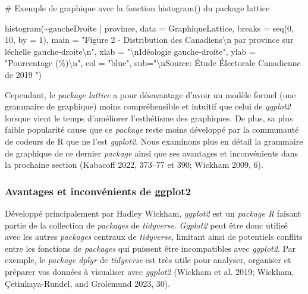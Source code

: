 \documentclass[
  letterpaper,
  DIV=11,
  numbers=noendperiod]{scrreprt}
\newenvironment{Shaded}{\begin{snugshade}}{\end{snugshade}}
\newcommand{\AttributeTok}[1]{\textcolor[rgb]{0.40,0.45,0.13}{#1}}
\newcommand{\CommentTok}[1]{\textcolor[rgb]{0.37,0.37,0.37}{#1}}
\newcommand{\DecValTok}[1]{\textcolor[rgb]{0.68,0.00,0.00}{#1}}
\newcommand{\FunctionTok}[1]{\textcolor[rgb]{0.28,0.35,0.67}{#1}}
\newcommand{\NormalTok}[1]{\textcolor[rgb]{0.00,0.23,0.31}{#1}}
\newcommand{\SpecialCharTok}[1]{\textcolor[rgb]{0.37,0.37,0.37}{#1}}
\newcommand{\StringTok}[1]{\textcolor[rgb]{0.13,0.47,0.30}{#1}}
\begin{document}
\begin{Shaded}
\begin{Highlighting}[]
\CommentTok{\# Exemple de graphique avec la fonction histogram() du package lattice}

\FunctionTok{histogram}\NormalTok{(}\SpecialCharTok{\textasciitilde{}}\NormalTok{gaucheDroite }\SpecialCharTok{|}\NormalTok{ province, }\AttributeTok{data =}\NormalTok{ GraphiqueLattice, }\AttributeTok{breaks =} \FunctionTok{seq}\NormalTok{(}\DecValTok{0}\NormalTok{, }\DecValTok{10}\NormalTok{, }
  \AttributeTok{by =} \DecValTok{1}\NormalTok{), }
  \AttributeTok{main =} \StringTok{"Figure 2 {-} Distribution des Canadiens}\SpecialCharTok{\textbackslash{}n}\StringTok{ par province sur l\textquotesingle{}échelle gauche{-}droite}\SpecialCharTok{\textbackslash{}n}\StringTok{"}\NormalTok{,}
  \AttributeTok{xlab =} \StringTok{"}\SpecialCharTok{\textbackslash{}n}\StringTok{Idéologie gauche{-}droite"}\NormalTok{,}
  \AttributeTok{ylab =} \StringTok{"Pourcentage (\%)}\SpecialCharTok{\textbackslash{}n}\StringTok{"}\NormalTok{,}
  \AttributeTok{col  =} \StringTok{"blue"}\NormalTok{,}
  \AttributeTok{sub=}\StringTok{"}\SpecialCharTok{\textbackslash{}n}\StringTok{Source: Étude Électorale Canadienne de 2019                                                "}\NormalTok{)}
\end{Highlighting}
\end{Shaded}

Cependant, le \emph{package lattice} a pour désavantage d'avoir un
modèle formel (une grammaire de graphique) moins compréhensible et
intuitif que celui de \emph{ggplot2} lorsque vient le temps d'améliorer
l'esthétisme des graphiques. De plus, sa plus faible popularité cause
que ce \emph{package} reste moins développé par la communauté de codeurs
de R que ne l'est \emph{ggplot2}. Nous examinons plus en détail la
grammaire de graphique de ce dernier \emph{package} ainsi que ses
avantages et inconvénients dans la prochaine section (Kabacoff 2022,
373--77 et 390; Wickham 2009, 6).

\hypertarget{avantages-et-inconvuxe9nients-de-ggplot2}{%
\subsubsection{Avantages et inconvénients de
ggplot2}\label{avantages-et-inconvuxe9nients-de-ggplot2}}

Développé principalement par Hadley Wickham, \emph{ggplot2} est un
\emph{package R} faisant partie de la collection de \emph{packages} de
\emph{tidyverse}. \emph{Ggplot2} peut être donc utilisé avec les autres
\emph{packages} centraux de \emph{tidyverse}, limitant ainsi de
potentiels conflits entre les fonctions de \emph{packages} qui puissent
être incompatibles avec \emph{ggplot2}. Par exemple, le \emph{package
dplyr} de \emph{tidyverse} est très utile pour analyser, organiser et
préparer vos données à visualiser avec \emph{ggplot2} (Wickham et al.
2019; Wickham, Çetinkaya-Rundel, and Grolemund 2023, 30).
\end{document}
